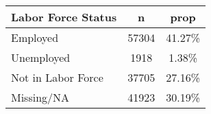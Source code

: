 \documentclass{article}
\begin{document}
\begin{table}[ht]
\centering
\begin{tabular}{lcc}
  \hline
  Labor Force Status & n & prop \\ 
  \hline
  Employed & 57304 & 41.27\% \\ 
  Unemployed & 1918 & 1.38\% \\ 
  Not in Labor Force & 37705 & 27.16\% \\ 
  Missing/NA  & 41923 & 30.19\% \\ 
   \hline
\end{tabular}
\end{table}
\end{document}
